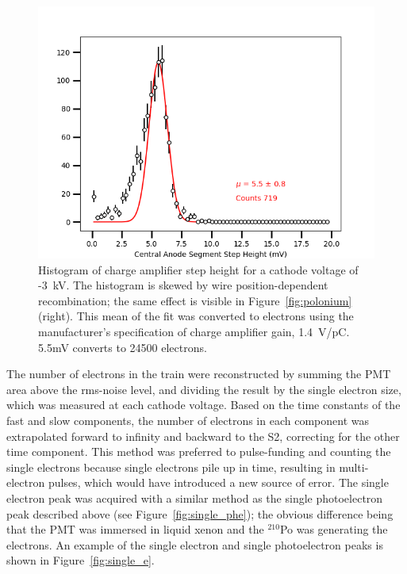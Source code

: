 \begin{figure}[htbp]
\begin{center}
\includegraphics[width=\textwidth]{figures/etrains/charge_hist.png}
\caption{Histogram of charge amplifier step height for a cathode voltage of -3~kV. The histogram is skewed by wire position-dependent recombination; the same effect is visible in Figure~\ref{fig:polonium} (right). This mean of the fit was converted to electrons using the manufacturer's specification of charge amplifier gain, 1.4~V/pC. 5.5mV converts to 24500 electrons.}
\label{fig:charge_hist}
\end{center}
\end{figure}

The number of electrons in the train were reconstructed by summing the \ac{PMT} area above the rms-noise level, and dividing the result by the single electron size, which was measured at each cathode voltage. Based on the time constants of the fast and slow components, the number of electrons in each component was extrapolated forward to infinity and backward to the S2, correcting for the other time component. This method was preferred to pulse-funding and counting the single electrons because single electrons pile up in time, resulting in multi-electron pulses, which would have introduced a new source of error. The single electron peak was acquired with a similar method as the single photoelectron peak described above (see Figure~\ref{fig:single_phe}); the obvious difference being that the \ac{PMT} was immersed in liquid xenon and the $^{210}$Po was generating the electrons. An example of the single electron and single photoelectron peaks is shown in Figure~\ref{fig:single_e}.

